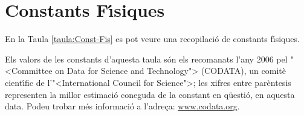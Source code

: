 \chapter{Constants F\'{\i}siques} 


En la Taula \vref{taula:Const-Fis} es pot veure una recopilaci\'{o} de
constants f\'{\i}siques.

Els valors de les constants d'aquesta taula s\'{o}n els recomanats
l'any 2006 pel {"<}Committee on Data for Science and Technology{">}
(\textsf{CODATA}), un comit\`{e} cient\'{\i}fic de l'{"<}International Council
for Science{">}; les xifres entre par\`{e}ntesis representen la millor
estimaci\'{o} coneguda de la constant en q\"{u}esti\'{o}, en aquesta
data. Podeu trobar  m\'{e}s informaci\'{o} a
l'adre\c{c}a: \href{http://www.codata.org/}{www.codata.org}.

